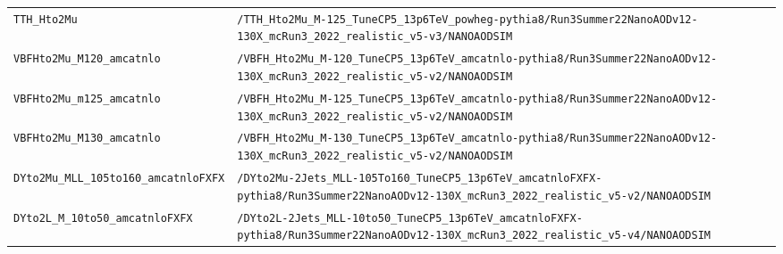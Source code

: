 \begin{longtable}{@{}>{\RaggedRight\arraybackslash}p{} >{\RaggedRight\arraybackslash}p{}@{}}
\addlinespace[2pt]
\texttt{TTH\_\allowbreak{}Hto2Mu} & \texttt{/\allowbreak{}TTH\_\allowbreak{}Hto2Mu\_\allowbreak{}M-\allowbreak{}125\_\allowbreak{}TuneCP5\_\allowbreak{}13p6TeV\_\allowbreak{}powheg-\allowbreak{}pythia8/\allowbreak{}Run3Summer22NanoAODv12-\allowbreak{}130X\_\allowbreak{}mcRun3\_\allowbreak{}2022\_\allowbreak{}realistic\_\allowbreak{}v5-\allowbreak{}v3/\allowbreak{}NANOAODSIM} \\
\addlinespace[2pt]
\texttt{VBFHto2Mu\_\allowbreak{}M120\_\allowbreak{}amcatnlo} & \texttt{/\allowbreak{}VBFH\_\allowbreak{}Hto2Mu\_\allowbreak{}M-\allowbreak{}120\_\allowbreak{}TuneCP5\_\allowbreak{}13p6TeV\_\allowbreak{}amcatnlo-\allowbreak{}pythia8/\allowbreak{}Run3Summer22NanoAODv12-\allowbreak{}130X\_\allowbreak{}mcRun3\_\allowbreak{}2022\_\allowbreak{}realistic\_\allowbreak{}v5-\allowbreak{}v2/\allowbreak{}NANOAODSIM} \\
\addlinespace[2pt]
\texttt{VBFHto2Mu\_\allowbreak{}m125\_\allowbreak{}amcatnlo} & \texttt{/\allowbreak{}VBFH\_\allowbreak{}Hto2Mu\_\allowbreak{}M-\allowbreak{}125\_\allowbreak{}TuneCP5\_\allowbreak{}13p6TeV\_\allowbreak{}amcatnlo-\allowbreak{}pythia8/\allowbreak{}Run3Summer22NanoAODv12-\allowbreak{}130X\_\allowbreak{}mcRun3\_\allowbreak{}2022\_\allowbreak{}realistic\_\allowbreak{}v5-\allowbreak{}v2/\allowbreak{}NANOAODSIM} \\
\addlinespace[2pt]
\texttt{VBFHto2Mu\_\allowbreak{}M130\_\allowbreak{}amcatnlo} & \texttt{/\allowbreak{}VBFH\_\allowbreak{}Hto2Mu\_\allowbreak{}M-\allowbreak{}130\_\allowbreak{}TuneCP5\_\allowbreak{}13p6TeV\_\allowbreak{}amcatnlo-\allowbreak{}pythia8/\allowbreak{}Run3Summer22NanoAODv12-\allowbreak{}130X\_\allowbreak{}mcRun3\_\allowbreak{}2022\_\allowbreak{}realistic\_\allowbreak{}v5-\allowbreak{}v2/\allowbreak{}NANOAODSIM} \\
\addlinespace[2pt]
\texttt{DYto2Mu\_\allowbreak{}MLL\_\allowbreak{}105to160\_\allowbreak{}amcatnloFXFX} & \texttt{/\allowbreak{}DYto2Mu-\allowbreak{}2Jets\_\allowbreak{}MLL-\allowbreak{}105To160\_\allowbreak{}TuneCP5\_\allowbreak{}13p6TeV\_\allowbreak{}amcatnloFXFX-\allowbreak{}pythia8/\allowbreak{}Run3Summer22NanoAODv12-\allowbreak{}130X\_\allowbreak{}mcRun3\_\allowbreak{}2022\_\allowbreak{}realistic\_\allowbreak{}v5-\allowbreak{}v2/\allowbreak{}NANOAODSIM} \\
\addlinespace[2pt]
\texttt{DYto2L\_\allowbreak{}M\_\allowbreak{}10to50\_\allowbreak{}amcatnloFXFX} & \texttt{/\allowbreak{}DYto2L-\allowbreak{}2Jets\_\allowbreak{}MLL-\allowbreak{}10to50\_\allowbreak{}TuneCP5\_\allowbreak{}13p6TeV\_\allowbreak{}amcatnloFXFX-\allowbreak{}pythia8/\allowbreak{}Run3Summer22NanoAODv12-\allowbreak{}130X\_\allowbreak{}mcRun3\_\allowbreak{}2022\_\allowbreak{}realistic\_\allowbreak{}v5-\allowbreak{}v4/\allowbreak{}NANOAODSIM} \\

\end{longtable}
